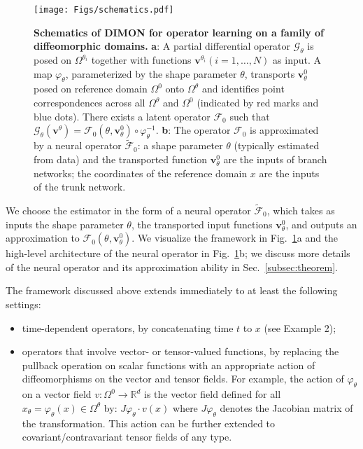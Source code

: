 \documentclass[review]{elsarticle}
\def\Omegatheta{{\Omega^\theta}}
\def\Omegathetai{{\Omega^{\theta_i}}}
\def\refd{0}
\def\Omegaref{{\Omega^\refd}}
\def\bfvtheta{\mathbf{v}^\theta}
\def\F0{{\mathcal{F}_{\refd}}}
\def\x{x}
\begin{document}
\begin{figure}
    \centering
	\texttt{[image: Figs/schematics.pdf]} 
    \caption{\textbf{Schematics of DIMON for operator learning on a family of diffeomorphic domains.} \textbf{a}: A partial differential operator $\mathcal{G}_{\theta}$ is posed on $\Omegathetai$ together with functions $\mathbf{v}^{\theta_i} (i=1,\dots, N)$ as input. A map $\varphi_{\theta}$, parameterized by the shape parameter $\theta$, transports $\mathbf{v}^{0}_{\theta}$ posed on reference domain $\Omegaref$ onto $\Omegatheta$ and identifies point correspondences across all $\Omegatheta$ and $\Omegaref$ (indicated by red marks and blue dots). There exists a latent operator $\F0$ such that $\mathcal{G}_{\theta}(\bfvtheta) = \F0(\theta, \mathbf{v}^0_\theta)\circ \varphi_{\theta}^{-1}$.  \textbf{b}: The operator $\F0$ is approximated by a neural operator $\tilde{\mathcal{F}}_{0}$: a shape parameter $\theta$ (typically estimated from data) and the transported function $\mathbf{v}^{0}_{\theta}$ are the inputs of branch networks; the coordinates of the reference domain $\x $ are the inputs of the trunk network.}
    \label{fig:schematics}
\end{figure}
We choose the estimator in the form of a neural operator $\tilde{\mathcal{F}}_0$, which takes as inputs the shape parameter $\theta$, the transported input functions $\mathbf{v}^0_\theta$, and outputs an approximation to $\F0(\theta,\mathbf{v}^\refd_\theta)$. We visualize the framework in Fig.~\ref{fig:schematics}a and the high-level architecture of the neural operator in Fig.~\ref{fig:schematics}b; we discuss more details of the neural operator and its approximation ability in Sec.~\ref{subsec:theorem}. 

The framework discussed above extends immediately to at least the following settings:
\begin{itemize} 
\item time-dependent operators, by concatenating time $t$ to $\x $ (see Example 2);
\item operators that involve vector- or tensor-valued functions, by replacing the pullback operation on scalar functions with an appropriate action of diffeomorphisms on the vector and tensor fields. For example, the action of $\varphi_{\theta}$ on a vector field $v:\Omegaref \rightarrow \mathbb{R}^d$ is the vector field defined for all $x_\theta=\varphi_{\theta}(x) \in \Omegatheta$ by: $J\varphi_{\theta} \cdot v(x)$ where $J\varphi_{\theta}$ denotes the Jacobian matrix of the transformation. 
This action can be further extended to covariant/contravariant tensor fields of any type.
\end{itemize}
\end{document}

